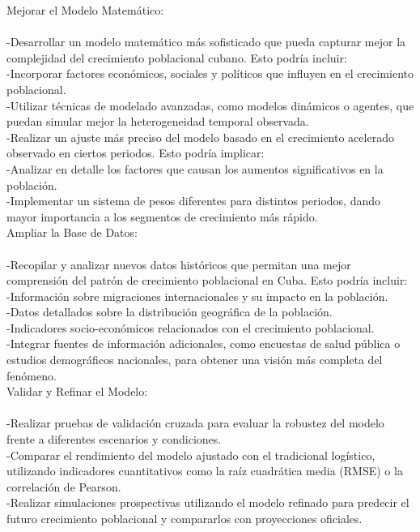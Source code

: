 \documentclass[a4paper,10pt,twocolumn]{article}
\begin{document}
Mejorar el Modelo Matemático:\\ \\
-Desarrollar un modelo matemático más sofisticado que pueda capturar mejor la complejidad del crecimiento poblacional cubano. Esto podría incluir:\\
-Incorporar factores económicos, sociales y políticos que influyen en el crecimiento poblacional.\\
-Utilizar técnicas de modelado avanzadas, como modelos dinámicos o agentes, que puedan simular mejor la heterogeneidad temporal observada.\\
-Realizar un ajuste más preciso del modelo basado en el crecimiento acelerado observado en ciertos periodos. Esto podría implicar:\\
-Analizar en detalle los factores que causan los aumentos significativos en la población.\\
-Implementar un sistema de pesos diferentes para distintos periodos, dando mayor importancia a los segmentos de crecimiento más rápido.\\
Ampliar la Base de Datos:\\ \\
-Recopilar y analizar nuevos datos históricos que permitan una mejor comprensión del patrón de crecimiento poblacional en Cuba. Esto podría incluir:\\
-Información sobre migraciones internacionales y su impacto en la población.\\
-Datos detallados sobre la distribución geográfica de la población.\\
-Indicadores socio-económicos relacionados con el crecimiento poblacional.\\
-Integrar fuentes de información adicionales, como encuestas de salud pública o estudios demográficos nacionales, para obtener una visión más completa del fenómeno.\\
Validar y Refinar el Modelo:\\ \\
-Realizar pruebas de validación cruzada para evaluar la robustez del modelo frente a diferentes escenarios y condiciones.\\
-Comparar el rendimiento del modelo ajustado con el tradicional logístico, utilizando indicadores cuantitativos como la raíz cuadrática media (RMSE) o la correlación de Pearson.\\
-Realizar simulaciones prospectivas utilizando el modelo refinado para predecir el futuro crecimiento poblacional y compararlos con proyecciones oficiales.\\
\end{document}
